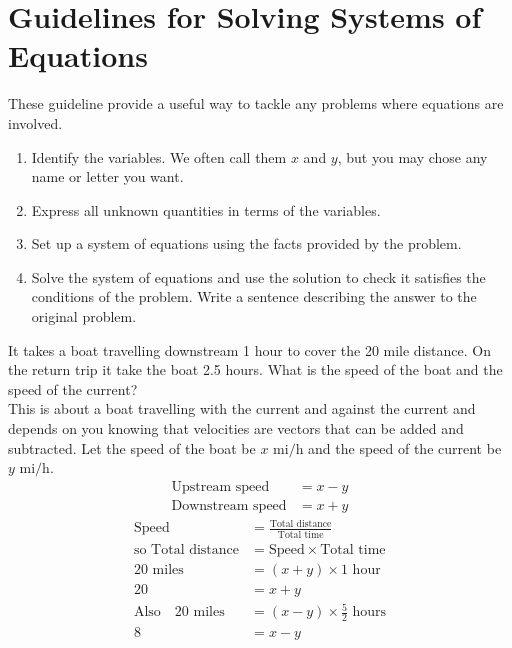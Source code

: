 \section*{Guidelines for Solving Systems of Equations}
 These guideline provide a useful way to tackle any problems where equations are involved.
 \begin{tcolorbox}

  \begin{enumerate}\setlength\itemsep{0em}
 	\item Identify the variables. We often call them $x$ and $y$, but you may chose any name or letter you want.
 	\item Express all unknown quantities in terms of the variables.
 	\item Set up a system of equations using the facts provided by the problem.
 	\item Solve the system of equations and use the solution to check it satisfies the conditions of the
 	problem. Write a sentence describing the answer to the original problem.
 \end{enumerate}
\end{tcolorbox}
 \clearpage
 \example It takes a boat travelling downstream 1 hour to cover the 20 mile distance. On the return trip it take the boat 2.5 hours. What is the speed of the boat and the speed of the current?\medskip\\
 \solution This is about a boat travelling with the current and against the current and depends on you knowing that velocities are vectors that can be added and subtracted. Let the speed of the boat be $x$ \mbox{mi}$/$\mbox{h} and the speed of the current be $y$ \mbox{mi}$/$\mbox{h}.
 	\begin{align*}\text{Upstream speed} &  =  x -y \\
 	\text{Downstream speed} &  =  x +y\end{align*}
 	\begin{align}\text{Speed} &  =  \frac{\text{Total distance}}{\text{Total time}} \nonumber  \\
 	\text{so Total distance} &  =  \text{Speed} \times \text{Total time} \nonumber  \\
 	20 \textrm{ miles } &  =  \left (x +y\right ) \times 1 \textrm{ hour} \nonumber  \\
 	20 &=x +y \tag{1} \\
 	\text{Also}\quad 20 \textrm{ miles }&  =  \left (x -y\right ) \times \frac{5}{2} \textrm{ hours}\nonumber  \\
 	8 &=x -y \tag{2}\end{align}
